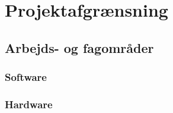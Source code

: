 \section{Projektafgrænsning}

\subsection{Arbejds- og fagområder}
 

\subsubsection{Software}


\subsubsection{Hardware}